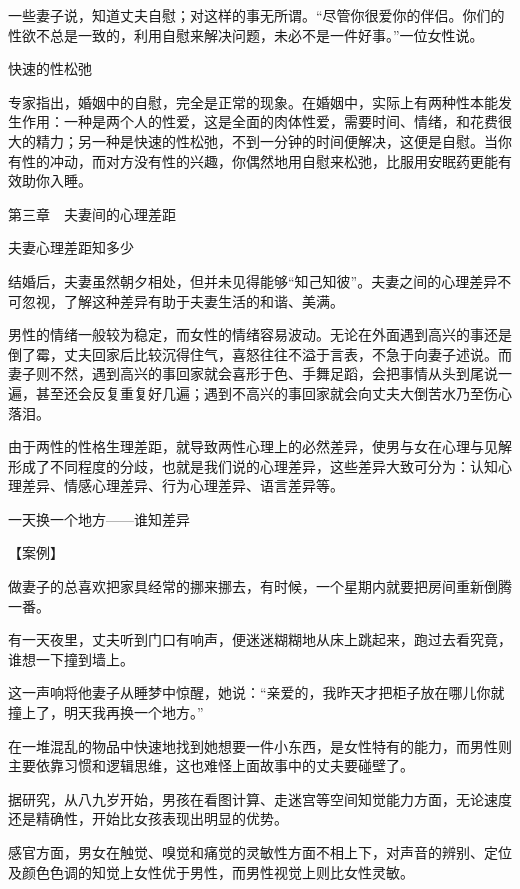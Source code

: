 \documentclass[12pt,UTF8]{ctexbook}
\begin{document}
一些妻子说，知道丈夫自慰；对这样的事无所谓。“尽管你很爱你的伴侣。你们的性欲不总是一致的，利用自慰来解决问题，未必不是一件好事。”一位女性说。





快速的性松弛


专家指出，婚姻中的自慰，完全是正常的现象。在婚姻中，实际上有两种性本能发生作用：一种是两个人的性爱，这是全面的肉体性爱，需要时间、情绪，和花费很大的精力；另一种是快速的性松弛，不到一分钟的时间便解决，这便是自慰。当你有性的冲动，而对方没有性的兴趣，你偶然地用自慰来松弛，比服用安眠药更能有效助你入睡。





第三章　夫妻间的心理差距


夫妻心理差距知多少


结婚后，夫妻虽然朝夕相处，但并未见得能够“知己知彼”。夫妻之间的心理差异不可忽视，了解这种差异有助于夫妻生活的和谐、美满。

男性的情绪一般较为稳定，而女性的情绪容易波动。无论在外面遇到高兴的事还是倒了霉，丈夫回家后比较沉得住气，喜怒往往不溢于言表，不急于向妻子述说。而妻子则不然，遇到高兴的事回家就会喜形于色、手舞足蹈，会把事情从头到尾说一遍，甚至还会反复重复好几遍；遇到不高兴的事回家就会向丈夫大倒苦水乃至伤心落泪。

由于两性的性格生理差距，就导致两性心理上的必然差异，使男与女在心理与见解形成了不同程度的分歧，也就是我们说的心理差异，这些差异大致可分为：认知心理差异、情感心理差异、行为心理差异、语言差异等。





一天换一个地方——谁知差异


【案例】

做妻子的总喜欢把家具经常的挪来挪去，有时候，一个星期内就要把房间重新倒腾一番。

有一天夜里，丈夫听到门口有响声，便迷迷糊糊地从床上跳起来，跑过去看究竟，谁想一下撞到墙上。

这一声响将他妻子从睡梦中惊醒，她说：“亲爱的，我昨天才把柜子放在哪儿你就撞上了，明天我再换一个地方。”

在一堆混乱的物品中快速地找到她想要一件小东西，是女性特有的能力，而男性则主要依靠习惯和逻辑思维，这也难怪上面故事中的丈夫要碰壁了。

据研究，从八九岁开始，男孩在看图计算、走迷宫等空间知觉能力方面，无论速度还是精确性，开始比女孩表现出明显的优势。

感官方面，男女在触觉、嗅觉和痛觉的灵敏性方面不相上下，对声音的辨别、定位及颜色色调的知觉上女性优于男性，而男性视觉上则比女性灵敏。
\end{document}
